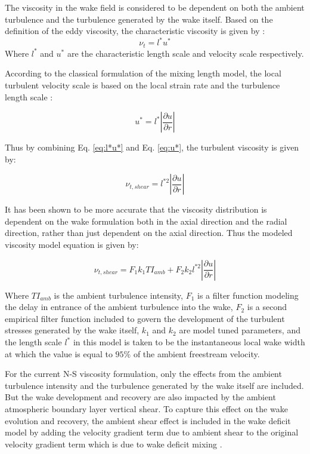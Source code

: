 \documentclass{umthesis}
\begin{document}
The viscosity in the wake field is considered to be dependent on both the ambient turbulence and the turbulence generated by the wake itself. Based on the definition of the eddy viscosity, the characteristic viscosity is given by \cite{Pope}:
\begin{equation}\label{eq:l*u*}
  \nu_t=l^*u^*
\end{equation}
Where $l^*$ and $u^*$ are the characteristic length scale and velocity scale respectively.

According to the classical formulation of the mixing length model, the local turbulent velocity scale is based on the local strain rate and the turbulence length scale \cite{Pope}:

\begin{equation}\label{eq:u*}
  u^*=l^*|\frac{\partial u}{\partial r}|
\end{equation}

Thus by combining Eq. \ref{eq:l*u*} and Eq. \ref{eq:u*}, the turbulent viscosity is given by:

\begin{equation}
  \nu_{t,shear}=l^{*2}|\frac{\partial u}{\partial r}|
\end{equation}

It has been shown to be more accurate that the viscosity distribution is dependent on the wake formulation both in the axial direction and the radial direction, rather than just dependent on the axial direction. Thus the modeled viscosity model equation is given by:

\begin{equation}
  \nu_{t,shear}=F_1k_1TI_{amb}+F_2k_2l^{*2}|\frac{\partial u}{\partial r}|
\end{equation}

Where $TI_{amb}$ is the ambient turbulence intensity, $F_1$ is a filter function modeling the delay in entrance of the ambient turbulence into the wake, $F_2$ is a second empirical filter function included to govern the development of the turbulent stresses generated by the wake itself, $k_1$ and $k_2$ are model tuned parameters, and the length scale $l^*$ in this model is taken to be the instantaneous local wake width at which the value is equal to $95\%$ of the ambient freestream velocity.

For the current N-S viscosity formulation, only the effects from the ambient turbulence intensity and the turbulence generated by the wake itself are included. But the wake development and recovery are also impacted by the ambient atmospheric boundary layer vertical shear. To capture this effect on the wake evolution and recovery, the ambient shear effect is included in the wake deficit model by adding the velocity gradient term due to ambient shear to the original velocity gradient term which is due to wake deficit mixing \cite{Keck_two}.
\end{document}
